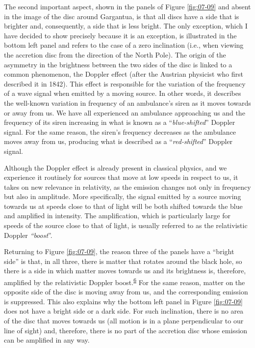 The second important aspect, shown in the panels of Figure \ref{fig:07-09} and absent in the image
of the disc around Gargantua, is that all discs have a side that is brighter and,
consequently, a side that is less bright. The only exception, which I have decided to
show precisely because it is an exception, is illustrated in the bottom left panel and
refers to the case of a zero inclination (i.e., when viewing the accretion disc from the
direction of the North Pole). The origin of the asymmetry in the brightness between the
two sides of the disc is linked to a common phenomenon, the Doppler
effect (after the Austrian physicist who first described it in 1842).
This effect is responsible for the variation of the frequency of a wave signal when
emitted by a moving source. In other words, it describes the well-known variation in
frequency of an ambulance's siren as it moves towards or away from us. We have all
experienced an ambulance approaching us and the frequency of its siren increasing in
what is known as a ``\emph{blue-shifted}'' Doppler signal. For the
same reason, the siren's frequency decreases as the ambulance moves away from us,
producing what is described as a ``\emph{red-shifted}'' Doppler
signal.

Although the Doppler effect is already present in classical physics, and we experience
it routinely for sources that move at low speeds in respect to us, it takes on new
relevance in relativity, as the emission changes not only in frequency but also in
amplitude. More specifically, the signal emitted by a source moving towards us at speeds
close to that of light will be both shifted towards the blue and amplified in intensity.
The amplification, which is particularly large for speeds of the source close to that of
light, is usually referred to as the relativistic Doppler
\emph{``boost}''.

Returning to Figure \ref{fig:07-09}, the reason three of the panels have a ``bright side'' is that,
in all three, there is matter that rotates around the black hole, so there is a side in
which matter moves towards us and its brightness is, therefore, amplified by the
relativistic Doppler boost.\textsuperscript{\hyperlink{note:07-06}{6}} For the same reason, matter on the
opposite side of the disc is moving away from us, and the corresponding emission is
suppressed. This also explains why the bottom left panel in Figure \ref{fig:07-09} does not have a
bright side or a dark side. For such inclination, there is no area of the disc that
moves towards us (all motion is in a plane perpendicular to our line of sight) and,
therefore, there is no part of the accretion disc whose emission can be amplified in any
way.

